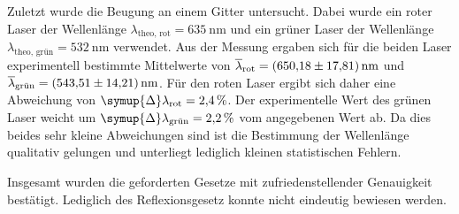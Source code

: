 Zuletzt wurde die Beugung an einem Gitter untersucht. Dabei wurde ein roter Laser der Wellenlänge $\lambda_{\text{theo, rot}} = \qty{635}{\nano\metre}$ und ein grüner Laser
der Wellenlänge $\lambda_{\text{theo, grün}} = \qty{532}{\nano\metre}$ verwendet. Aus der Messung ergaben sich für die beiden Laser experimentell bestimmte Mittelwerte von 
$\overline{\lambda}_{\text{rot}} = \qty{650.18 +- 17.81}{\nano\metre}$ und $\overline{\lambda}_{\text{grün}} = \qty{543.51 +- 14.21}{\nano\metre}$. Für den roten Laser ergibt 
sich daher eine Abweichung von $\symup{\Delta}\lambda_{\text{rot}} = \qty{2.4}{\percent}$. Der experimentelle Wert des grünen Laser weicht um 
$\symup{\Delta}\lambda_{\text{grün}} = \qty{2.2}{\percent}$ vom angegebenen Wert ab. Da dies beides sehr kleine Abweichungen sind ist die Bestimmung der Wellenlänge 
qualitativ gelungen und unterliegt lediglich kleinen statistischen Fehlern.

Insgesamt wurden die geforderten Gesetze mit zufriedenstellender Genauigkeit bestätigt. Lediglich des Reflexionsgesetz konnte nicht eindeutig bewiesen werden. 